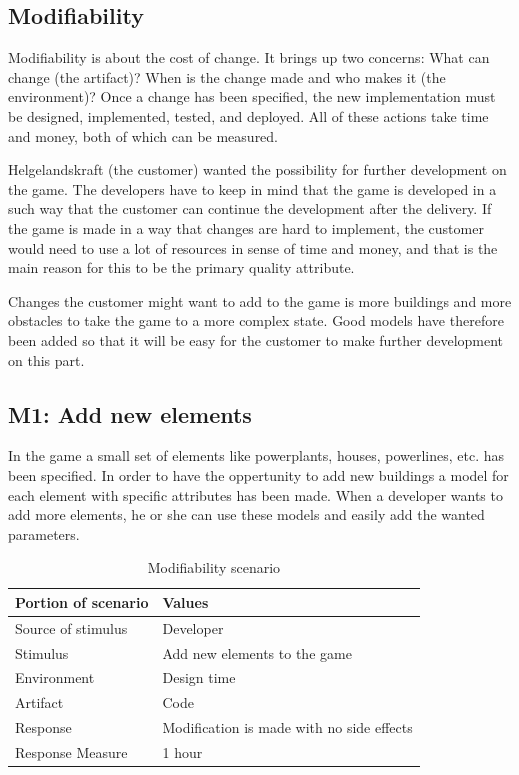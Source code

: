\subsection{Modifiability}

Modifiability \cite{attributes} is about the cost of change. It brings up two concerns: 
What can change (the artifact)? 
When is the change made and who makes it (the environment)? 
Once a change has been specified, the new implementation must be designed, 
implemented, tested, and deployed. All of these actions take time and money, both of which can be measured.

Helgelandskraft (the customer) wanted the possibility for further development on the game. The developers
have to keep in mind that the game is developed in a such way that the customer can continue
the development after the delivery. If the game is made in a way that changes are hard to implement, 
the customer would need to use a lot of resources in sense of time and money, and that is the main 
reason for this to be the primary quality attribute.

Changes the customer might want to add to the game is more buildings and more obstacles to take
the game to a more complex state. Good models have therefore been added so that it will be easy for 
the customer to make further development on this part.

\subsection*{M1: Add new elements}
In the game a small set of elements like powerplants, houses, powerlines, etc. has been specified.
In order to have the oppertunity to add new buildings a model for each element with specific attributes has been made. When a developer wants to add more elements, he or she can use these models and easily add the wanted parameters. 

\begin{table}[H]
\begin{tabular}{| l | l |}
	\hline
	\rowcolor{gray}
	{\bf Portion of scenario} & {\bf Values} \\ \hline
	Source of stimulus & Developer\\ \hline
	Stimulus & Add new elements to the game\\ \hline
	Environment & Design time \\ \hline
	Artifact & Code \\ \hline
	Response & Modification is made with no side effects\\ \hline
	Response Measure & 1 hour\\ \hline
\end{tabular}
\caption{Modifiability scenario}
\end{table}

